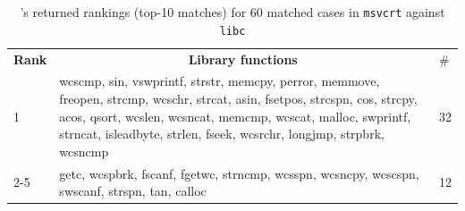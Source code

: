 \begin{table}[t]
\begin{tabular}{@{}lll@{}}
\end{tabular}\vspace{-1mm}
\end{table}

\begin{table}[t]
\scriptsize
\centering
\caption{\toolNew's returned rankings (top-10 matches) for 60 matched cases  in \texttt{msvcrt} against \texttt{libc}}
\label{tab:cross-os-new}
\begin{tabular}{@{}lll@{}}
\multicolumn{1}{c}{\textbf{Rank}}    & \multicolumn{1}{c}{\textbf{Library functions}}   & \#                       \\ \cmidrule(l){1-3}
\multicolumn{1}{l|}{1}      & \multicolumn{1}{l|}{\parbox{6cm}{wcscmp, sin, vswprintf, strstr, memcpy, perror, memmove, freopen, strcmp, wcschr, strcat, asin, fsetpos, strcspn, cos, strcpy, acos, qsort, wcslen, wcsncat, memcmp, wcscat, malloc, swprintf, strncat, isleadbyte, strlen, fseek, wcsrchr, longjmp, strpbrk, wcsncmp}}                                                              & \multicolumn{1}{l}{32}  \\ \cmidrule(l){1-3}
\multicolumn{1}{l|}{2-5}    & \multicolumn{1}{l|}{\parbox{6cm}{getc, wcspbrk, fscanf, fgetwc, strncmp, wcsspn, wcsncpy, wcscspn, swscanf, strspn, tan, calloc}} & \multicolumn{1}{l}{12} \\ \cmidrule(l){1-3}


\end{tabular}
\end{table}
